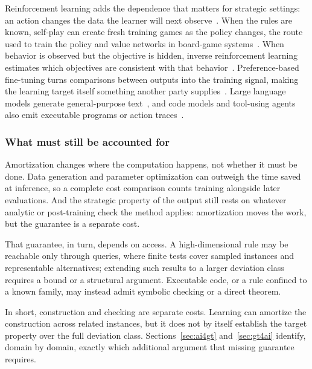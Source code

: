 Reinforcement learning adds the dependence that matters for strategic settings:
an action changes the data the learner will next
observe~\citep{SuttonBarto2018,Williams1992,SuttonPolicyGradient2000,Mnih2015}.
When the rules are known, self-play can create fresh training games as the
policy changes, the route used to train the policy and value networks in
board-game systems~\citep{Silver2018}. When behavior is observed but the objective
is hidden, inverse reinforcement learning estimates which objectives are
consistent with that behavior~\citep{NgRussell2000,HoErmon2016}. Preference-based
fine-tuning turns comparisons between outputs into the training signal, making the
learning target itself something another party
supplies~\citep{Christiano2017,Ouyang2022}. Large language models generate
general-purpose text~\citep{BrownGPT3_2020}, and code models and tool-using agents
also emit executable programs or action
traces~\citep{ChenCodex2021,YaoReAct2023,SchickToolformer2023}.

\subsubsection{What must still be accounted for}

Amortization changes where the computation happens, not whether it must be done.
Data generation and parameter optimization can outweigh the time saved at inference,
so a complete cost comparison counts training alongside later evaluations. And the
strategic property of the output still rests on whatever analytic or post-training check the method applies: amortization
moves the work, but the guarantee is a separate cost.

That guarantee, in turn, depends on access. A high-dimensional rule may be
reachable only through queries, where finite tests cover sampled instances and
representable alternatives; extending such results to a larger deviation class
requires a bound or a structural argument. Executable code, or a rule confined to
a known family, may instead admit symbolic checking or a direct theorem.

In short, construction and checking are separate costs. Learning can amortize
the construction across related instances, but it does not by itself establish
the target property over the full deviation class.
Sections~\ref{sec:ai4gt} and~\ref{sec:gt4ai} identify, domain by domain, exactly
which additional argument that missing guarantee requires.
